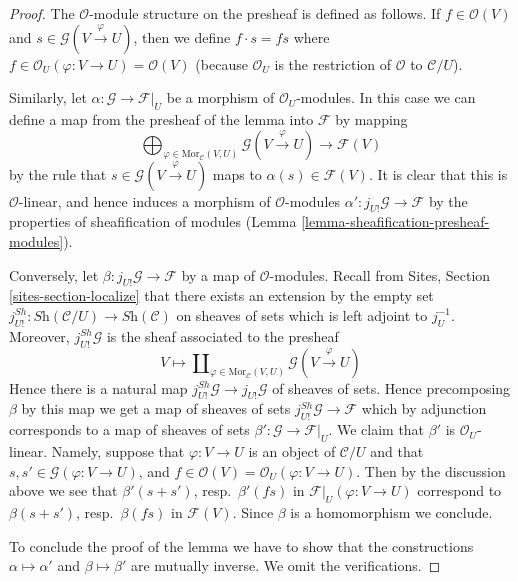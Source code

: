 \begin{proof}
The $\mathcal{O}$-module structure on the presheaf is defined as
follows. If $f \in \mathcal{O}(V)$ and
$s \in \mathcal{G}(V \xrightarrow{\varphi} U)$, then
we define $f \cdot s = fs$ where
$f \in \mathcal{O}_U(\varphi : V \to U) = \mathcal{O}(V)$
(because $\mathcal{O}_U$ is the restriction of $\mathcal{O}$ to
$\mathcal{C}/U$).

\medskip\noindent
Similarly, let $\alpha : \mathcal{G} \to \mathcal{F}|_U$ be a
morphism of $\mathcal{O}_U$-modules. In this case we can define
a map from the presheaf of the lemma into $\mathcal{F}$ by mapping
$$
\bigoplus\nolimits_{\varphi \in \text{Mor}_{\mathcal{C}}(V, U)}
\mathcal{G}(V \xrightarrow{\varphi} U)
\longrightarrow
\mathcal{F}(V)
$$
by the rule that $s \in \mathcal{G}(V \xrightarrow{\varphi} U)$
maps to $\alpha(s) \in \mathcal{F}(V)$. It is clear that this is
$\mathcal{O}$-linear, and hence induces a morphism of
$\mathcal{O}$-modules $\alpha' : j_{U!}\mathcal{G} \to \mathcal{F}$
by the properties of sheafification of modules
(Lemma \ref{lemma-sheafification-presheaf-modules}).

\medskip\noindent
Conversely, let $\beta : j_{U!}\mathcal{G} \to \mathcal{F}$
by a map of $\mathcal{O}$-modules.
Recall from Sites, Section \ref{sites-section-localize}
that there exists an extension by the empty set
$j^{Sh}_{U!} : \textit{Sh}(\mathcal{C}/U) \to \textit{Sh}(\mathcal{C})$
on sheaves of sets which is left adjoint to $j_U^{-1}$.
Moreover, $j^{Sh}_{U!}\mathcal{G}$ is the sheaf associated to the presheaf
$$
V
\longmapsto
\coprod\nolimits_{\varphi \in \text{Mor}_{\mathcal{C}}(V, U)}
\mathcal{G}(V \xrightarrow{\varphi} U)
$$
Hence there is a natural map
$j^{Sh}_{U!}\mathcal{G} \to j_{U!}\mathcal{G}$ of sheaves of sets.
Hence precomposing $\beta$ by this map we get a map of sheaves of sets
$j^{Sh}_{U!}\mathcal{G} \to \mathcal{F}$ which by adjunction corresponds
to a map of sheaves of sets $\beta' : \mathcal{G} \to \mathcal{F}|_U$.
We claim that $\beta'$ is $\mathcal{O}_U$-linear. Namely, suppose
that $\varphi : V \to U$ is an object of $\mathcal{C}/U$ and that
$s, s' \in \mathcal{G}(\varphi : V \to U)$, and
$f \in \mathcal{O}(V) = \mathcal{O}_U(\varphi : V \to U)$.
Then by the discussion above we see that 
$\beta'(s + s')$, resp.\  $\beta'(fs)$ in $\mathcal{F}|_U(\varphi : V \to U)$
correspond to $\beta(s + s')$, resp.\ $\beta(fs)$ in
$\mathcal{F}(V)$. Since $\beta$ is a homomorphism we conclude.

\medskip\noindent
To conclude the proof of the lemma we have to show that the constructions
$\alpha \mapsto \alpha'$ and $\beta \mapsto \beta'$ are mutually inverse.
We omit the verifications.
\end{proof}

